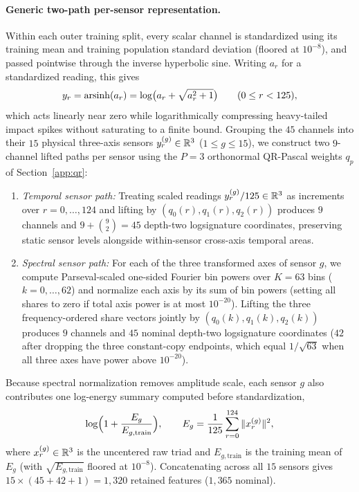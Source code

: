 \paragraph{Generic two-path per-sensor representation.}
Within each outer training split, every scalar channel is standardized using its
training mean and training population standard deviation (floored at \(10^{-8}\)),
and passed pointwise through the inverse hyperbolic sine. Writing \(a_r\) for a
standardized reading, this gives
\[
 y_r = \operatorname{arsinh}(a_r) = \log\bigl(a_r + \sqrt{a_r^2 + 1}\bigr)
 \qquad (0 \leq r < 125),
\]
which acts linearly near zero while logarithmically compressing heavy-tailed
impact spikes without saturating to a finite bound. Grouping the \(45\) channels
into their \(15\) physical three-axis sensors \(y_r^{(g)} \in \mathbb{R}^3\)
(\(1 \leq g \leq 15\)), we construct two \(9\)-channel lifted paths per sensor
using the \(P = 3\) orthonormal QR-Pascal weights \(q_p\) of Section~\ref{app:qr}:
\begin{enumerate}
\item \emph{Temporal sensor path:} Treating scaled readings
\(y_r^{(g)} / 125 \in \mathbb{R}^3\) as increments over \(r = 0, \ldots, 124\) and
lifting by \((q_0(r), q_1(r), q_2(r))\) produces \(9\) channels and
\(9 + \binom{9}{2} = 45\) depth-two logsignature coordinates, preserving static
sensor levels alongside within-sensor cross-axis temporal areas.
\item \emph{Spectral sensor path:} For each of the three transformed axes of
sensor \(g\), we compute Parseval-scaled one-sided Fourier bin powers over
\(K = 63\) bins (\(k = 0, \ldots, 62\)) and normalize each axis by its sum of bin
powers (setting all shares to zero if total axis power is at most \(10^{-20}\)).
Lifting the three frequency-ordered share vectors jointly by
\((q_0(k), q_1(k), q_2(k))\) produces \(9\) channels and \(45\) nominal depth-two
logsignature coordinates (\(42\) after dropping the three constant-copy endpoints,
which equal \(1/\sqrt{63}\) when all three axes have power above \(10^{-20}\)).
\end{enumerate}
Because spectral normalization removes amplitude scale, each sensor \(g\) also
contributes one log-energy summary computed before standardization,
\[
 \log\Bigl(1 + \frac{E_g}{E_{g,\mathrm{train}}}\Bigr), \qquad
 E_g = \frac{1}{125}\sum_{r=0}^{124} \|x_r^{(g)}\|^2,
\]
where \(x_r^{(g)} \in \mathbb{R}^3\) is the uncentered raw triad and \(E_{g,\mathrm{train}}\)
is the training mean of \(E_g\) (with \(\sqrt{E_{g,\mathrm{train}}}\) floored at
\(10^{-8}\)). Concatenating across all \(15\) sensors gives
\(15 \times (45 + 42 + 1) = 1{,}320\) retained features (\(1{,}365\) nominal).

